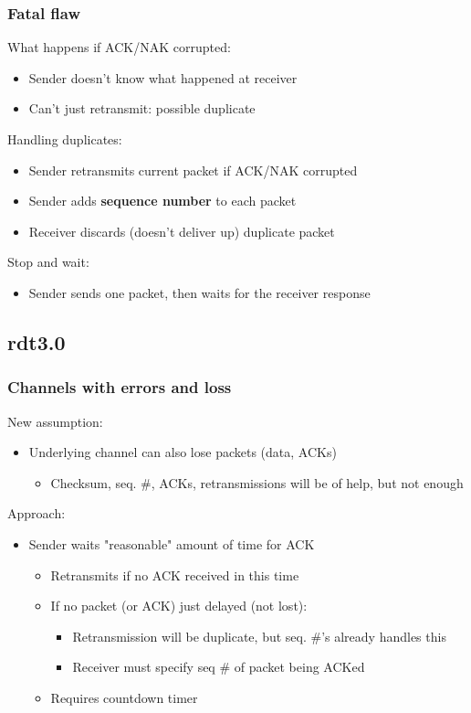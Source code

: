 \documentclass{article}[18pt]
\begin{document}
\subsubsection{Fatal flaw}
What happens if ACK/NAK corrupted:
\begin{itemize}
	\item Sender doesn't know what happened at receiver
	\item Can't just retransmit: possible duplicate
\end{itemize}
Handling duplicates:
\begin{itemize}
	\item Sender retransmits current packet if ACK/NAK corrupted
	\item Sender adds \textbf{sequence number} to each packet
	\item Receiver discards (doesn't deliver up) duplicate packet
\end{itemize}
Stop and wait:
\begin{itemize}
	\item Sender sends one packet, then waits for the receiver response
\end{itemize}
\subsection{rdt3.0}
\subsubsection{Channels with errors and loss}
New assumption:
\begin{itemize}
	\item Underlying channel can also lose packets (data, ACKs)
	\begin{itemize}
		\item Checksum, seq. \#, ACKs, retransmissions will be of help, but not enough
	\end{itemize}
\end{itemize}
Approach:
\begin{itemize}
	\item Sender waits "reasonable" amount of time for ACK
	\begin{itemize}
		\item Retransmits if no ACK received in this time
		\item If no packet (or ACK) just delayed (not lost):
		\begin{itemize}
			\item Retransmission will be duplicate, but seq. \#'s already handles this
			\item Receiver must specify seq \# of packet being ACKed
		\end{itemize}
		\item Requires countdown timer
	\end{itemize}
\end{itemize}
\end{document}
